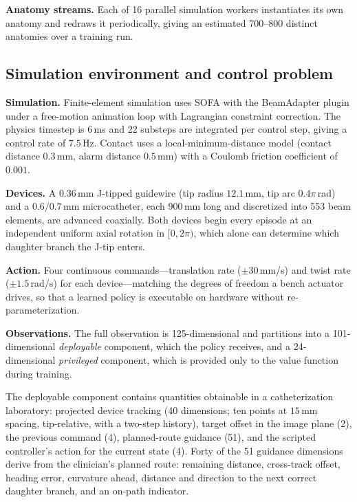 \textbf{Anatomy streams.} Each of 16 parallel simulation workers instantiates its own anatomy
and redraws it periodically, giving an estimated 700--800 distinct anatomies over a training
run.

\subsection{Simulation environment and control problem}

\textbf{Simulation.} Finite-element simulation uses SOFA with the BeamAdapter plugin under a
free-motion animation loop with Lagrangian constraint correction. The physics timestep is
$6$\,ms and 22 substeps are integrated per control step, giving a control rate of $7.5$\,Hz.
Contact uses a local-minimum-distance model (contact distance $0.3$\,mm, alarm distance
$0.5$\,mm) with a Coulomb friction coefficient of $0.001$.

\textbf{Devices.} A $0.36$\,mm J-tipped guidewire (tip radius $12.1$\,mm, tip arc $0.4\pi$\,rad)
and a $0.6/0.7$\,mm microcatheter, each $900$\,mm long and discretized into 553 beam elements,
are advanced coaxially. Both devices begin every episode at an independent uniform axial
rotation in $[0, 2\pi)$, which alone can determine which daughter branch the J-tip enters.

\textbf{Action.} Four continuous commands---translation rate ($\pm 30$\,mm/s) and twist rate
($\pm 1.5$\,rad/s) for each device---matching the degrees of freedom a bench actuator drives,
so that a learned policy is executable on hardware without re-parameterization.

\textbf{Observations.} The full observation is 125-dimensional and partitions into a
101-dimensional \emph{deployable} component, which the policy receives, and a 24-dimensional
\emph{privileged} component, which is provided only to the value function during training.

The deployable component contains quantities obtainable in a catheterization laboratory:
projected device tracking (40 dimensions; ten points at $15$\,mm spacing, tip-relative, with a
two-step history), target offset in the image plane (2), the previous command (4),
planned-route guidance (51), and the scripted controller's action for the current state (4).
Forty of the 51 guidance dimensions derive from the clinician's planned route: remaining
distance, cross-track offset, heading error, curvature ahead, distance and direction to the
next correct daughter branch, and an on-path indicator.

